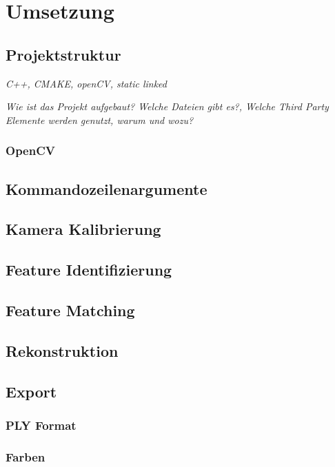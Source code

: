 
\chapter{Umsetzung}

\section{Projektstruktur}
\emph{C++, CMAKE, openCV, static linked}


\emph{Wie ist das Projekt aufgebaut? Welche Dateien gibt es?, Welche Third Party Elemente werden genutzt, warum und wozu?}

\subsection{OpenCV}

\section{Kommandozeilenargumente}

\section{Kamera Kalibrierung}


\section{Feature Identifizierung}

\section{Feature Matching}

\section{Rekonstruktion}

\section{Export}
\subsection{PLY Format}
\subsection{Farben}